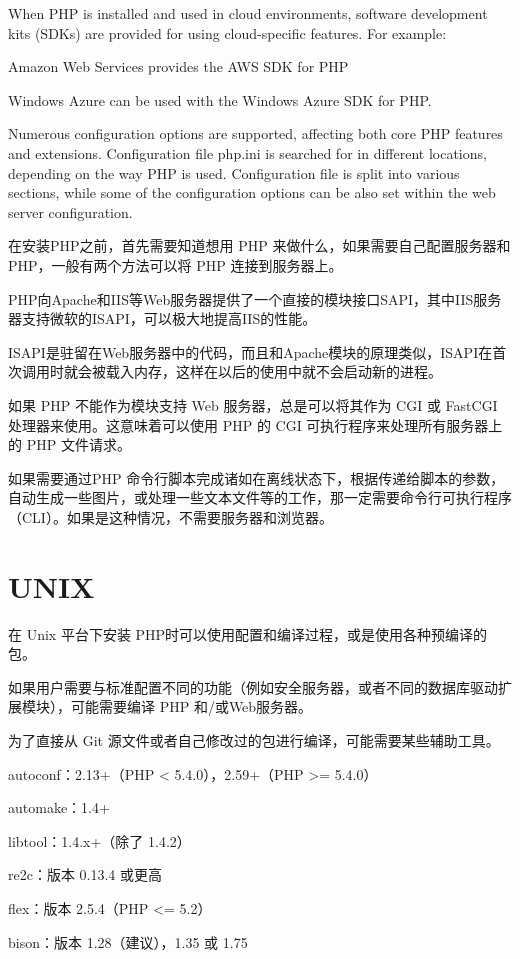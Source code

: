 When PHP is installed and used in cloud environments, software development kits (SDKs) are provided for using cloud-specific features. For example:


\begin{compactitem}
\item Amazon Web Services provides the AWS SDK for PHP
\item Windows Azure can be used with the Windows Azure SDK for PHP.
\end{compactitem}

Numerous configuration options are supported, affecting both core PHP features and extensions. Configuration file php.ini is searched for in different locations, depending on the way PHP is used. Configuration file is split into various sections, while some of the configuration options can be also set within the web server configuration.


在安装PHP之前，首先需要知道想用 PHP 来做什么，如果需要自己配置服务器和 PHP，一般有两个方法可以将 PHP 连接到服务器上。

PHP向Apache和IIS等Web服务器提供了一个直接的模块接口SAPI，其中IIS服务器支持微软的ISAPI，可以极大地提高IIS的性能。

ISAPI是驻留在Web服务器中的代码，而且和Apache模块的原理类似，ISAPI在首次调用时就会被载入内存，这样在以后的使用中就不会启动新的进程。



如果 PHP 不能作为模块支持 Web 服务器，总是可以将其作为 CGI 或 FastCGI 处理器来使用。这意味着可以使用 PHP 的 CGI 可执行程序来处理所有服务器上的 PHP 文件请求。

如果需要通过PHP 命令行脚本完成诸如在离线状态下，根据传递给脚本的参数，自动生成一些图片，或处理一些文本文件等的工作，那一定需要命令行可执行程序（CLI）。如果是这种情况，不需要服务器和浏览器。


\section{UNIX}

在 Unix 平台下安装 PHP时可以使用配置和编译过程，或是使用各种预编译的包。

如果用户需要与标准配置不同的功能（例如安全服务器，或者不同的数据库驱动扩展模块），可能需要编译 PHP 和/或Web服务器。

为了直接从 Git 源文件或者自己修改过的包进行编译，可能需要某些辅助工具。

\begin{compactitem}
\item autoconf：2.13+（PHP < 5.4.0），2.59+（PHP >= 5.4.0）
\item automake：1.4+
\item libtool：1.4.x+（除了 1.4.2）
\item re2c：版本 0.13.4 或更高
\item flex：版本 2.5.4（PHP <= 5.2）
\item bison：版本 1.28（建议），1.35 或 1.75
\end{compactitem}

